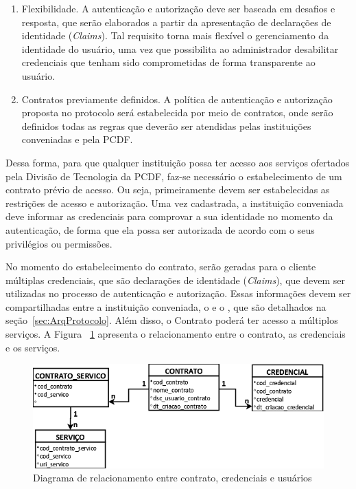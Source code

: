 \begin{enumerate}[RQ1]
\item Flexibilidade. A autenticação e autorização deve ser baseada em desafios e resposta, que serão elaborados a partir da apresentação de declarações de identidade (\emph{Claims}). Tal requisito torna mais flexível o gerenciamento da identidade do usuário, uma vez que possibilita ao administrador desabilitar credenciais que tenham sido comprometidas de forma transparente ao usuário.

\item Contratos previamente definidos. A política de autenticação e autorização proposta no protocolo será estabelecida por meio de contratos, onde serão definidos todas as regras que deverão ser atendidas pelas instituições conveniadas e pela PCDF.

\end{enumerate}

Dessa forma, para que qualquer instituição possa ter acesso aos serviços ofertados pela Divisão de Tecnologia da PCDF, faz-se necessário o estabelecimento de um contrato prévio de acesso. Ou seja, primeiramente devem ser estabelecidas as restrições de acesso e autorização. Uma vez cadastrada, a instituição conveniada deve informar as credenciais para comprovar a sua identidade no momento da autenticação, de forma que ela possa ser autorizada de acordo com o seus privilégios ou permissões.

No momento do estabelecimento do contrato, serão geradas para o cliente múltiplas credenciais, que são declarações de identidade (\emph{Claims}), que devem ser utilizadas no processo de autenticação e autorização. Essas informações devem ser compartilhadas entre a instituição conveniada, o \servidorAA e o \servidorRest, que são detalhados na seção~\ref{sec:ArqProtocolo}. Além disso, o Contrato poderá ter acesso a múltiplos serviços. A Figura ~\ref{fig:diagrama_relacionamento} apresenta o relacionamento entre o contrato, as credenciais e os serviços.

\begin{figure}[!htb]
    \centering
    \includegraphics[width=1.0\textwidth]{modelo_relacionamento_contrato1.png}
    \caption{Diagrama de relacionamento entre contrato, credenciais e usuários}
    \label{fig:diagrama_relacionamento}
\end{figure}


